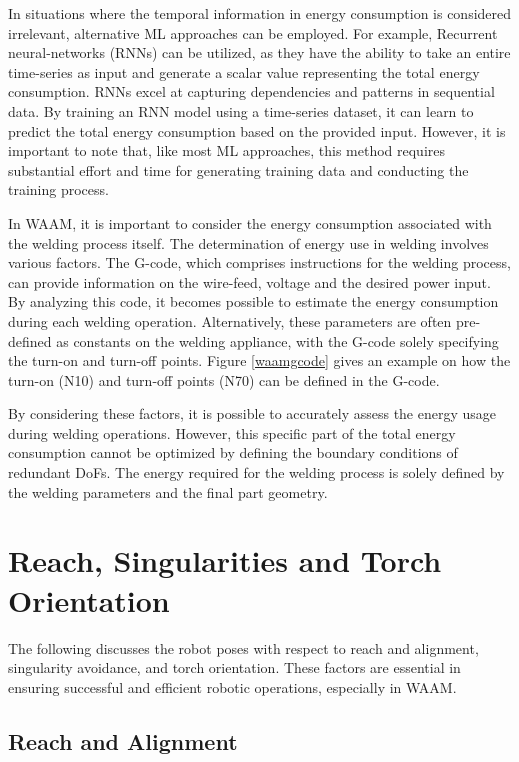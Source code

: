 \documentclass[conference]{IEEEtran}
\begin{document}
In situations where the temporal information in energy consumption is considered irrelevant, alternative ML approaches can be employed. For example, Recurrent neural-networks (RNNs) can be utilized, as they have the ability to take an entire time-series as input and generate a scalar value representing the total energy consumption. RNNs excel at capturing dependencies and patterns in sequential data. By training an RNN model using a time-series dataset, it can learn to predict the total energy consumption based on the provided input. However, it is important to note that, like most ML approaches, this method requires substantial effort and time for generating training data and conducting the training process.

In WAAM, it is important to consider the energy consumption associated with the welding process itself. The determination of energy use in welding involves various factors. The G-code, which comprises instructions for the welding process, can provide information on the wire-feed, voltage and the desired power input. By analyzing this code, it becomes possible to estimate the energy consumption during each welding operation. Alternatively, these parameters are often pre-defined as constants on the welding appliance, with the G-code solely specifying the turn-on and turn-off points. Figure \ref{waamgcode} gives an example on how the turn-on (N10) and turn-off points (N70) can be defined in the G-code.



By considering these factors, it is possible to accurately assess the energy usage during welding operations. However, this specific part of the total energy consumption cannot be optimized by defining the boundary conditions of redundant DoFs. The energy required for the welding process is solely defined by the welding parameters and the final part geometry.


\section{Reach, Singularities and Torch Orientation}
The following discusses the robot poses with respect to reach and alignment, singularity avoidance, and torch orientation. These factors are essential in ensuring successful and efficient robotic operations, especially in WAAM.

\subsection{Reach and Alignment}\label{RO}
\end{document}
